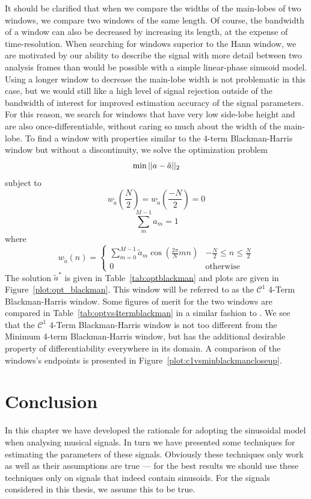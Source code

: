 It should be clarified that when we compare the widths of the main-lobes of two
windows, we compare two windows of the same length. Of course, the bandwidth of
a window can also be decreased by increasing its length, at the expense of
time-resolution. When searching for windows superior to the Hann window, we are
motivated by our ability to describe the signal with more detail between two
analysis frames than would be possible with a simple linear-phase sinusoid
model. Using a longer window to decrease the main-lobe width is not problematic
in this case, but we would still like a high level of signal rejection outside
of the bandwidth of interest for improved estimation accuracy of the signal
parameters. For this reason, we search for windows that have very low side-lobe
height and are also once-differentiable, without caring so much about the width
of the main-lobe. To find a window with properties similar to the 4-term
Blackman-Harris window but without a discontinuity, we solve the optimization
problem
\[
        \min||a-\tilde{a}||_2 \\
\]
subject to
\[
        w_{\tilde{a}} \left( \frac{N}{2} \right)
            = w_{\tilde{a}} \left( \frac{-N}{2} \right) = 0
\]
\[
        \sum_{m}^{M-1} a_{m} = 1
\]
where
\[
    w_{\tilde{a}}(n) = \begin{cases}
        \sum_{m=0}^{M-1}\tilde{a}_{m}\cos \left( \frac{2\pi}{N}mn \right) & -\frac{N}{2} \leq n
        \leq \frac{N}{2} \\
        0 & \text{otherwise}
    \end{cases}
\]
The solution $\tilde{a}^{\ast}$ is given in Table~\ref{tab:optblackman} and
plots are given in Figure~\ref{plot:opt_blackman}. This window will be referred
to as the $\mathcal{C}^{1}$ 4-Term Blackman-Harris window. Some figures of merit
for the two windows are compared in Table~\ref{tab:optvs4termblackman} in a similar
fashion to \cite{harris1978use}. We see
that the $\mathcal{C}^{1}$ 4-Term Blackman-Harris window is not too different
from the Minimum 4-term Blackman-Harris window, but has the additional
desirable property of differentiability everywhere in its domain. A comparison
of the windows's endpoints is presented in
Figure~\ref{plot:c1vsminblackmancloseup}.

\section{Conclusion}

In this chapter we have developed the rationale for adopting the sinusoidal
model when analysing musical signals. In turn we have presented some techniques
for estimating the parameters of these signals. Obviously these techniques only
work as well as their assumptions are true --- for the best results we should
use these techniques only on signals that indeed contain sinusoids. For the
signals considered in this thesis, we assume this to be true.

